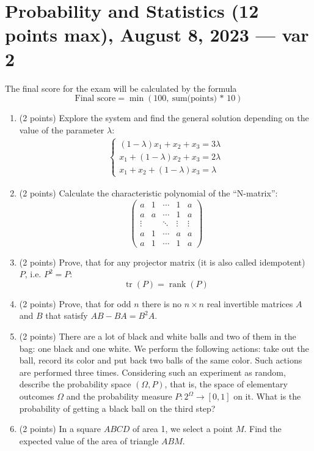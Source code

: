 \documentclass{article}
\begin{document}
\newpage
\section*{Probability and Statistics (12 points max), August 8, 2023 — var 2}
The final score for the exam will be calculated by the formula
$$ \text{Final score} = \min(100,\ \text{sum(points) * 10})$$

\begin{enumerate}
  \item (2 points) Explore the system and find the general solution depending on the value of the parameter $\lambda$:
  \begin{align*}
    \begin{cases}
      (1 - \lambda)x_1 + x_2 + x_3 = 3\lambda \\
      x_1 + (1 - \lambda)x_2 + x_3 = 2\lambda \\
      x_1 + x_2 + (1 - \lambda)x_3 = \lambda
    \end{cases}
  \end{align*}

  \item (2 points) Calculate the characteristic polynomial of the ``N-matrix'':
  \[
    \begin{pmatrix}
      a & 1 & \cdots & 1 & a \\
      a & a & \cdots & 1 & a \\
      \vdots &  & \ddots & \vdots & \vdots \\
      a & 1 & \cdots & a & a \\
      a & 1 & \cdots & 1 & a
      \end{pmatrix}  \]  

  \item (2 points) Prove, that for any projector matrix (it is also called idempotent) $P$, i.e. $P^2 = P$:
   $$ \operatorname{tr} (P) = \operatorname{rank} (P)$$

  \item (2 points) Prove, that for odd $n$ there is no $n \times n$ real invertible 
  matrices $A$ and $B$ that satisfy $AB - BA = B^2A$.

  \item (2 points) There are a lot of black and white balls and 
  two of them in the bag: one black and one white. 
  We perform the following actions: take out the ball, 
  record its color and put back two balls of the same color. 
  Such actions are performed three times. Considering such 
  an experiment as random, describe the probability space $(\Omega, P)$, 
  that is, the space of elementary outcomes $\Omega$ and 
  the probability measure $P: 2^{\Omega} \rightarrow [0, 1]$ on it. 
  What is the probability of getting a black ball on the third step?

  \item (2 points) In a square $ABCD$ of area 1, we select a point $M$. 
  Find the expected value of the area of triangle $ABM$.
\end{enumerate}
\end{document}
